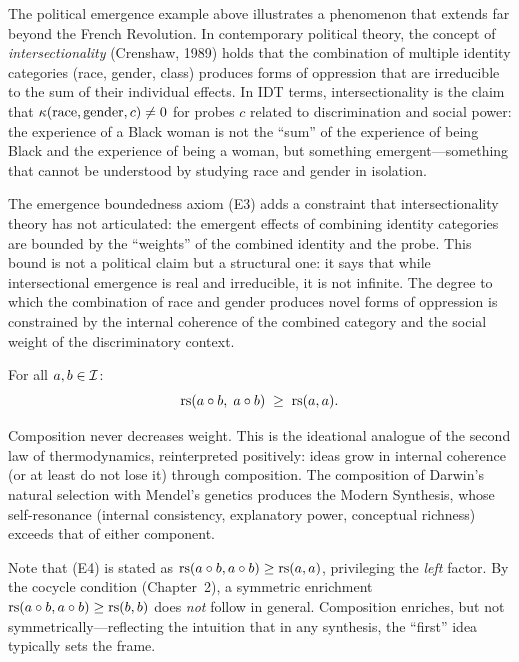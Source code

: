 \begin{interpretation}\label{interp:ch1:emergence_political}
The political emergence example above illustrates a phenomenon that
extends far beyond the French Revolution. In contemporary political
theory, the concept of \emph{intersectionality} (Crenshaw, 1989) holds
that the combination of multiple identity categories (race, gender,
class) produces forms of oppression that are irreducible to the sum of
their individual effects. In IDT terms, intersectionality is the claim
that $\kappa(\text{race}, \text{gender}, c) \neq 0$ for probes $c$
related to discrimination and social power: the experience of a Black
woman is not the ``sum'' of the experience of being Black and the
experience of being a woman, but something emergent---something that
cannot be understood by studying race and gender in isolation.

The emergence boundedness axiom (E3) adds a constraint that
intersectionality theory has not articulated: the emergent effects of
combining identity categories are bounded by the ``weights'' of the
combined identity and the probe. This bound is not a political claim
but a structural one: it says that while intersectional emergence is
real and irreducible, it is not infinite. The degree to which the
combination of race and gender produces novel forms of oppression is
constrained by the internal coherence of the combined category and the
social weight of the discriminatory context.
\end{interpretation}

\begin{axiom_def}
For all $a, b \in \mathcal{I}$:
\[
    \mathrm{rs}(a \circ b, \; a \circ b) \;\geq\; \mathrm{rs}(a, a).
\]
\end{axiom_def}

\begin{interpretation}
Composition never decreases weight. This is the ideational analogue of the
second law of thermodynamics, reinterpreted positively: ideas grow in
internal coherence (or at least do not lose it) through composition. The
composition of Darwin's natural selection with Mendel's genetics produces
the Modern Synthesis, whose self-resonance (internal consistency,
explanatory power, conceptual richness) exceeds that of either component.

Note that (E4) is stated as $\mathrm{rs}(a \circ b, a \circ b) \geq
\mathrm{rs}(a,a)$, privileging the \emph{left} factor. By the cocycle condition
(Chapter~2), a symmetric enrichment $\mathrm{rs}(a \circ b, a \circ b) \geq
\mathrm{rs}(b,b)$ does \emph{not} follow in general. Composition enriches, but
not symmetrically---reflecting the intuition that in any synthesis, the
``first'' idea typically sets the frame.
\end{interpretation}


